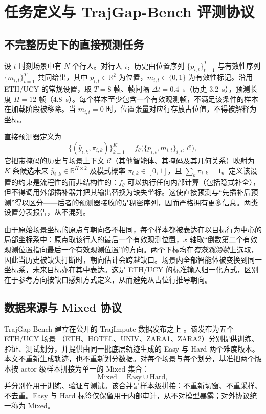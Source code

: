 \section{任务定义与 TrajGap-Bench 评测协议}
\label{sec:bench}

\subsection{不完整历史下的直接预测任务}
\label{sec:task}

设 $t$ 时刻场景中有 $N$ 个行人。对行人 $i$，历史由位置序列 $\{p_{i,t}\}_{t=1}^{T}$ 与有效性序列 $\{m_{i,t}\}_{t=1}^{T}$ 共同给出，其中 $p_{i,t}\in\mathbb{R}^{2}$ 为位置，$m_{i,t}\in\{0,1\}$ 为有效性标记。沿用 ETH/UCY 的常规设置，取 $T=8$ 帧、帧间隔 $\Delta t=0.4$~s（历史 3.2~s），预测长度 $H=12$ 帧（4.8~s）。每个样本至少包含一个有效观测帧，不满足该条件的样本在加载阶段被移除。当 $m_{i,t}=0$ 时，位置张量对应行存放占位值，不得被解释为坐标。

直接预测器定义为
\begin{equation}
\{(\hat{y}_{i,k},\pi_{i,k})\}_{k=1}^{K}=f_{\theta}\big(\{p_{i,t},m_{i,t}\}_{i,t},\,\mathcal{C}\big),
\label{eq:task}
\end{equation}
它把带掩码的历史与场景上下文 $\mathcal{C}$（其他智能体、其掩码及其几何关系）映射为 $K$ 条候选未来 $\hat{y}_{i,k}\in\mathbb{R}^{H\times 2}$ 及模式概率 $\pi_{i,k}\in[0,1]$，且 $\sum_{k}\pi_{i,k}=1$。定义该设置的约束是流程性的而非结构性的：$f_{\theta}$ 可以执行任何内部计算（包括隐式补全），但不得调用外部插补器并把其输出替换为缺失坐标。这使直接预测与“先插补后预测”得以区分——后者的预测器接收的是稠密序列，因而严格拥有更多信息。两类设置分表报告，从不混列。

由于原始场景坐标的原点与朝向各不相同，每个样本都被表达在以目标行为中心的局部坐标系中：原点取该行人的最后一个有效观测位置，$x$ 轴取“倒数第二个有效观测位置指向最后一个有效观测位置”的方向。两个下标均在\emph{有效观测帧}上选取，因此当历史被缺失打断时，朝向估计会跨越缺口。场景内全部智能体被变换到同一坐标系，未来目标亦在其中表达。这是 ETH/UCY 的标准输入归一化方式，区别在于参考方向按缺口感知方式定义，从而避免从占位行推导朝向。

\subsection{数据来源与 Mixed 协议}
\label{sec:mixed}

TrajGap-Bench 建立在公开的 TrajImpute 数据发布之上 \cite{chib2024pedestrian}。该发布为五个 ETH/UCY 场景 \cite{lerner2007crowds,pellegrini2009you}（ETH、HOTEL、UNIV、ZARA1、ZARA2）分别提供训练、验证、测试划分，并提供由同一批底层轨迹生成的 Easy 与 Hard 两个难度版本。本文不重新生成轨迹，也不重新划分数据。对每个场景与每个划分，基准把两个版本按 actor 级样本拼接为单一的 Mixed 集合：
\begin{equation}
\text{Mixed} = \text{Easy} \cup \text{Hard},
\end{equation}
并分别作用于训练、验证与测试。该合并是样本级拼接：不重新切窗、不重采样、不去重。Easy 与 Hard 标签仅保留用于内部审计，从不对模型暴露；对外协议统一称为 Mixed。


